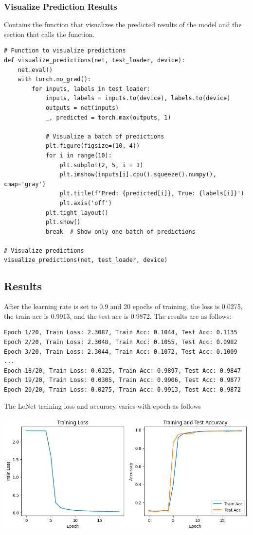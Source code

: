 \documentclass[a4paper,12pt]{article}
\begin{document}
\subsubsection{Visualize Prediction Results}
Contains the function that visualizes the predicted results of the model and the section that calls the function.
\begin{lstlisting}
# Function to visualize predictions
def visualize_predictions(net, test_loader, device):
    net.eval()
    with torch.no_grad():
        for inputs, labels in test_loader:
            inputs, labels = inputs.to(device), labels.to(device)
            outputs = net(inputs)
            _, predicted = torch.max(outputs, 1)

            # Visualize a batch of predictions
            plt.figure(figsize=(10, 4))
            for i in range(10):
                plt.subplot(2, 5, i + 1)
                plt.imshow(inputs[i].cpu().squeeze().numpy(), cmap='gray')
                plt.title(f'Pred: {predicted[i]}, True: {labels[i]}')
                plt.axis('off')
            plt.tight_layout()
            plt.show()
            break  # Show only one batch of predictions

# Visualize predictions
visualize_predictions(net, test_loader, device)

\end{lstlisting}

\subsection{Results}
After the learning rate is set to 0.9 and 20 epochs of training, the loss is 0.0275, the train acc is 0.9913, and the
test acc is 0.9872. The results are as follows:

\begin{lstlisting}
Epoch 1/20, Train Loss: 2.3087, Train Acc: 0.1044, Test Acc: 0.1135
Epoch 2/20, Train Loss: 2.3048, Train Acc: 0.1055, Test Acc: 0.0982
Epoch 3/20, Train Loss: 2.3044, Train Acc: 0.1072, Test Acc: 0.1009
...
Epoch 18/20, Train Loss: 0.0325, Train Acc: 0.9897, Test Acc: 0.9847
Epoch 19/20, Train Loss: 0.0305, Train Acc: 0.9906, Test Acc: 0.9877
Epoch 20/20, Train Loss: 0.0275, Train Acc: 0.9913, Test Acc: 0.9872
\end{lstlisting}

The LeNet training loss and accuracy varies with epoch as follows

\centering %
\includegraphics[width=0.8\linewidth]{images/lab2_4_loss.png}
\end{document}
